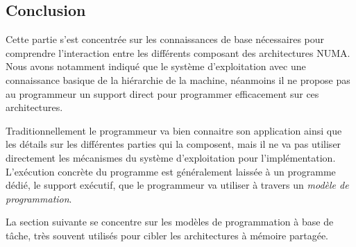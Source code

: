 \subsection*{Conclusion}

Cette partie s'est concentrée sur les connaissances de base nécessaires pour comprendre l'interaction entre les différents composant des architectures NUMA.
Nous avons notamment indiqué que le système d'exploitation avec une connaissance basique de la hiérarchie de la machine, néanmoins il ne propose pas au programmeur un support direct pour programmer efficacement sur ces architectures.

Traditionnellement le programmeur va bien connaitre son application ainsi que les détails sur les différentes parties qui la composent, mais il ne va pas utiliser directement les mécanismes du système d'exploitation pour l'implémentation.
L'exécution concrète du programme est généralement laissée à un programme dédié, le support exécutif, que le programmeur va utiliser à travers un \emph{modèle de programmation}.

La section suivante se concentre sur les modèles de programmation à base de tâche, très souvent utilisés pour cibler les architectures à mémoire partagée.
